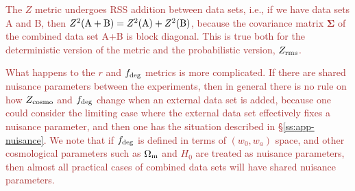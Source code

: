 \documentclass[usenatbib]{mnras}
\newcommand{\changetext}[1]{\textcolor{brown}{#1}}
\begin{document}
\changetext{The $Z$ metric undergoes RSS addition between data sets, i.e., if we have data sets A and B, then $Z^2({\rm A+B)} = Z^2({\rm A}) + Z^2({\rm B})$, because the covariance matrix ${\boldsymbol\Sigma}$ of the combined data set A+B is block diagonal. This is true both for the deterministic version of the metric and the probabilistic version, $Z_{\rm rms}$.}

\changetext{What happens to the $r$ and $f_{\rm deg}$ metrics is more complicated. If there are shared nuisance parameters between the experiments, then in general there is no rule on how $Z_{\rm cosmo}$ and $f_{\rm deg}$ change when an external data set is added, because one could consider the limiting case where the external data set effectively fixes a nuisance parameter, and then one has the situation described in \S\ref{ss:app-nuisance}. We note that if $f_{\rm deg}$ is defined in terms of $(w_0,w_a)$ space, and other cosmological parameters such as $\Omega_{\rm m}$ and $H_0$ are treated as nuisance parameters, then almost all practical cases of combined data sets will have shared nuisance parameters.}
\end{document}
